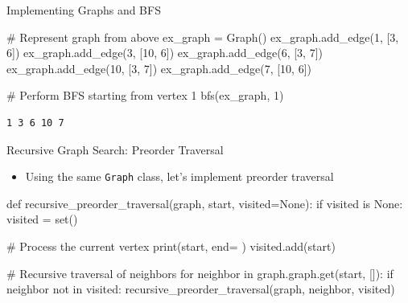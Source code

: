 \documentclass[
  ignorenonframetext,
]{beamer}
\newenvironment{Shaded}{\begin{snugshade}}{\end{snugshade}}
\newcommand{\BuiltInTok}[1]{\textcolor[rgb]{0.00,0.23,0.31}{#1}}
\newcommand{\CommentTok}[1]{\textcolor[rgb]{0.37,0.37,0.37}{#1}}
\newcommand{\ControlFlowTok}[1]{\textcolor[rgb]{0.00,0.23,0.31}{#1}}
\newcommand{\DecValTok}[1]{\textcolor[rgb]{0.68,0.00,0.00}{#1}}
\newcommand{\KeywordTok}[1]{\textcolor[rgb]{0.00,0.23,0.31}{#1}}
\newcommand{\NormalTok}[1]{\textcolor[rgb]{0.00,0.23,0.31}{#1}}
\newcommand{\OperatorTok}[1]{\textcolor[rgb]{0.37,0.37,0.37}{#1}}
\newcommand{\StringTok}[1]{\textcolor[rgb]{0.13,0.47,0.30}{#1}}
\newcommand{\VariableTok}[1]{\textcolor[rgb]{0.07,0.07,0.07}{#1}}
\providecommand{\tightlist}{%
  \setlength{\itemsep}{0pt}\setlength{\parskip}{0pt}}\usepackage{longtable,booktabs,array}
\begin{document}
\begin{frame}[fragile]{Implementing Graphs and BFS}
\protect\hypertarget{implementing-graphs-and-bfs-2}{}
\begin{Shaded}
\begin{Highlighting}[]
\CommentTok{\# Represent graph from above}
\NormalTok{ex\_graph }\OperatorTok{=}\NormalTok{ Graph()}
\NormalTok{ex\_graph.add\_edge(}\DecValTok{1}\NormalTok{, [}\DecValTok{3}\NormalTok{, }\DecValTok{6}\NormalTok{])}
\NormalTok{ex\_graph.add\_edge(}\DecValTok{3}\NormalTok{, [}\DecValTok{10}\NormalTok{, }\DecValTok{6}\NormalTok{])}
\NormalTok{ex\_graph.add\_edge(}\DecValTok{6}\NormalTok{, [}\DecValTok{3}\NormalTok{, }\DecValTok{7}\NormalTok{])}
\NormalTok{ex\_graph.add\_edge(}\DecValTok{10}\NormalTok{, [}\DecValTok{3}\NormalTok{, }\DecValTok{7}\NormalTok{])}
\NormalTok{ex\_graph.add\_edge(}\DecValTok{7}\NormalTok{, [}\DecValTok{10}\NormalTok{, }\DecValTok{6}\NormalTok{])}

\CommentTok{\# Perform BFS starting from vertex 1}
\NormalTok{bfs(ex\_graph, }\DecValTok{1}\NormalTok{)}
\end{Highlighting}
\end{Shaded}

\begin{verbatim}
1 3 6 10 7 
\end{verbatim}
\end{frame}

\begin{frame}[fragile]{Recursive Graph Search: Preorder Traversal}
\protect\hypertarget{recursive-graph-search-preorder-traversal}{}
\begin{itemize}
\tightlist
\item
  Using the same \texttt{Graph} class, let's implement preorder
  traversal
\end{itemize}

\begin{Shaded}
\begin{Highlighting}[]
\KeywordTok{def}\NormalTok{ recursive\_preorder\_traversal(graph, start, visited}\OperatorTok{=}\VariableTok{None}\NormalTok{):}
  \ControlFlowTok{if}\NormalTok{ visited }\KeywordTok{is} \VariableTok{None}\NormalTok{:}
\NormalTok{    visited }\OperatorTok{=} \BuiltInTok{set}\NormalTok{()}

  \CommentTok{\# Process the current vertex}
  \BuiltInTok{print}\NormalTok{(start, end}\OperatorTok{=}\StringTok{\textquotesingle{} \textquotesingle{}}\NormalTok{)}
\NormalTok{  visited.add(start)}

    \CommentTok{\# Recursive traversal of neighbors}
  \ControlFlowTok{for}\NormalTok{ neighbor }\KeywordTok{in}\NormalTok{ graph.graph.get(start, []):}
    \ControlFlowTok{if}\NormalTok{ neighbor }\KeywordTok{not} \KeywordTok{in}\NormalTok{ visited:}
\NormalTok{      recursive\_preorder\_traversal(graph, neighbor, visited)}
\end{Highlighting}
\end{Shaded}
\end{frame}
\end{document}
